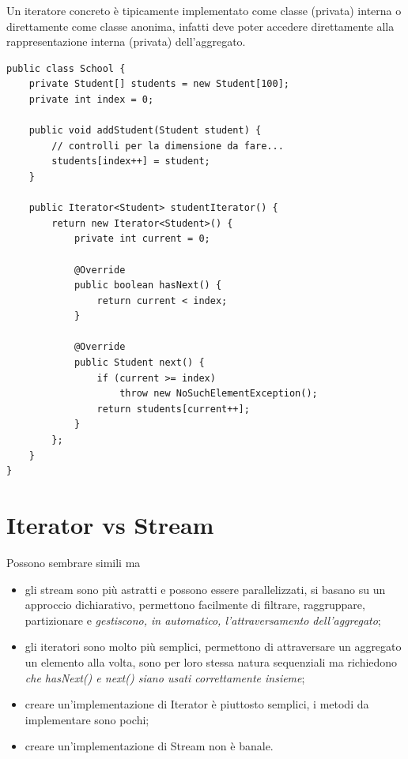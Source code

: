 Un iteratore concreto è tipicamente implementato come classe (privata) interna o direttamente come classe anonima, infatti deve poter accedere direttamente alla
rappresentazione interna (privata) dell’aggregato.
\begin{lstlisting}
public class School {
    private Student[] students = new Student[100];
    private int index = 0;
    
    public void addStudent(Student student) {
        // controlli per la dimensione da fare...
        students[index++] = student;
    }

    public Iterator<Student> studentIterator() {
        return new Iterator<Student>() {
            private int current = 0;

            @Override
            public boolean hasNext() {
                return current < index;
            }

            @Override
            public Student next() {
                if (current >= index)
                    throw new NoSuchElementException();
                return students[current++];
            }
        };
    }
}
\end{lstlisting}

\section{Iterator vs Stream}

Possono sembrare simili ma
\begin{itemize}
    \item gli stream sono più astratti e possono essere parallelizzati, si basano su un approccio dichiarativo, permettono facilmente di filtrare, raggruppare, 
    partizionare e \textit{gestiscono, in automatico, l’attraversamento dell’aggregato};
    \item gli iteratori sono molto più semplici, permettono di attraversare un aggregato un elemento alla volta, sono per loro stessa natura sequenziali ma 
    richiedono \textit{che hasNext() e next() siano usati correttamente insieme};
    \item creare un’implementazione di Iterator è piuttosto semplici, i metodi da implementare sono pochi;
    \item creare un’implementazione di Stream non è banale.
\end{itemize}